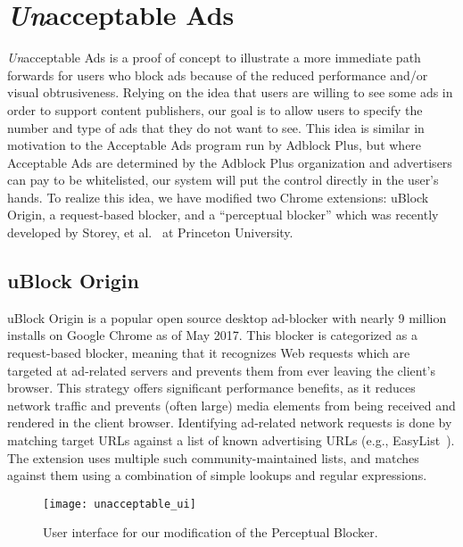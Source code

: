 \section{\textit{Un}acceptable Ads}
\textit{Un}acceptable Ads is a proof of concept to illustrate a more immediate path forwards for users who block ads because of the reduced performance and/or visual obtrusiveness.
Relying on the idea that users are willing to see some ads in order to support content publishers, our goal is to allow users to specify the number and type of ads that they do not want to see.
This idea is similar in motivation to the Acceptable Ads program run by Adblock Plus, but where Acceptable Ads are determined by the Adblock Plus organization and advertisers can pay to be whitelisted, our system will put the control directly in the user's hands.
To realize this idea, we have modified two Chrome extensions: uBlock Origin, a request-based blocker, and a ``perceptual blocker'' which was recently developed by Storey, et al.~\cite{storey2016future} at Princeton University.

\subsection{uBlock Origin}
uBlock Origin is a popular open source desktop ad-blocker with nearly 9 million installs on Google Chrome as of May 2017.
This blocker is categorized as a request-based blocker, meaning that it recognizes Web requests which are targeted at ad-related servers and prevents them from ever leaving the client's browser.
This strategy offers significant performance benefits, as it reduces network traffic and prevents (often large) media elements from being received and rendered in the client browser.
Identifying ad-related network requests is done by matching target URLs against a list of known advertising URLs (e.g., EasyList~\cite{easylist}).
The extension uses multiple such community-maintained lists, and matches against them using a combination of simple lookups and regular expressions.

\begin{figure}[t]
\centering
\texttt{[image: unacceptable\_ui]}
\caption{User interface for our modification of the Perceptual Blocker.}
\label{fig:unacceptable_ui}
\end{figure}

